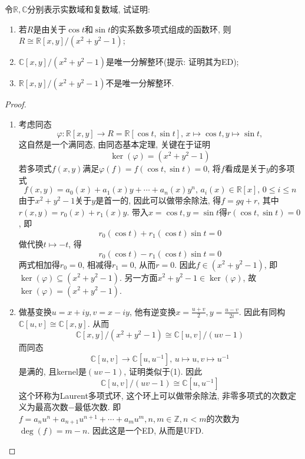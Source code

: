 \begin{problem}\label{ex:2.2.6}
    令$\mathbb{R}, \mathbb{C}$分别表示实数域和复数域, 试证明: 
\begin{enumerate}[(1)]
    \item 若$R$是由关于$\cos t$和$\sin t$的实系数多项式组成的函数环, 
则$R \cong \mathbb{R}[x, y]/(x^2 + y^2 - 1)$;
    \item $\mathbb{C}[x, y]/(x^2 + y^2 - 1)$是唯一分解整环(提示: 证明其为ED);
    \item $\mathbb{R}[x, y]/(x^2 + y^2 - 1)$不是唯一分解整环.
\end{enumerate}
\end{problem}

\begin{proof}
\begin{enumerate}[(1)]
    \item 考虑同态
    \[
        \varphi: \mathbb{R}[x, y] \to R = \mathbb{R}[\cos t, \sin t],\, x \mapsto \cos t, y \mapsto \sin t,
    \]
    这自然是一个满同态, 由同态基本定理, 关键在于证明
    \[
        \ker(\varphi) = (x^2 + y^2 - 1)
    \]
    若多项式$f(x, y)$满足$\varphi(f) = f(\cos t, \sin t) = 0$, 将$f$看成是关于$y$的多项式
    \[
        f(x, y) = a_0(x) + a_1(x)y + \cdots + a_n(x)y^n,\, a_i(x) \in \mathbb{R}[x],\, 0 \leqslant i \leqslant n
    \]
    由于$x^2 + y^2 - 1$关于$y$是首一的, 因此可以做带余除法, 得$f = gq + r$, 其中$r(x, y) = r_0(x) + r_1(x)y$. 带入$x = \cos t, y = \sin t$得$r(\cos t, \sin t) = 0$, 即
    \[
        r_0(\cos t) + r_1(\cos t)\sin t = 0
    \]
    做代换$t \mapsto -t$, 得
    \[
        r_0(\cos t) - r_1(\cos t)\sin t = 0
    \]
    两式相加得$r_0 = 0$, 相减得$r_1 = 0$, 从而$r = 0$. 因此$f \in (x^2 + y^2 - 1)$, 即$\ker(\varphi) \subseteq (x^2 + y^2 - 1)$. 另一方面$x^2 + y^2 - 1 \in \ker(\varphi)$, 故$\ker(\varphi) = (x^2 + y^2 - 1)$.
    \item 做基变换$u = x + iy, v = x - iy$, 他有逆变换$x = \frac{u + v}{2}, y = \frac{u - v}{2i}$. 因此有同构$\mathbb{C}[u, v] \cong \mathbb{C}[x, y]$. 从而
    \[
        \mathbb{C}[x, y]/(x^2 + y^2 - 1) \cong \mathbb{C}[u, v]/(uv - 1)
    \]
    而同态
    \[
        \mathbb{C}[u, v] \to \mathbb{C}[u, u^{-1}],\, u \mapsto u, v \mapsto u^{-1}
    \]
    是满的, 且kernel是$(uv - 1)$, 证明类似于(1). 因此
    \[
        \mathbb{C}[u, v]/(uv - 1) \cong \mathbb{C}[u, u^{-1}]
    \]
    这个环称为Laurent多项式环, 这个环上可以做带余除法, 非零多项式的次数定义为最高次数$-$最低次数. 即$f = a_nu^n + a_{n + 1}u^{n + 1} + \cdots + a_mu^m, n, m \in \mathbb{Z}, n < m$的次数为$\deg(f) = m - n$.
    因此这是一个ED, 从而是UFD.

\end{enumerate}
\end{proof}
